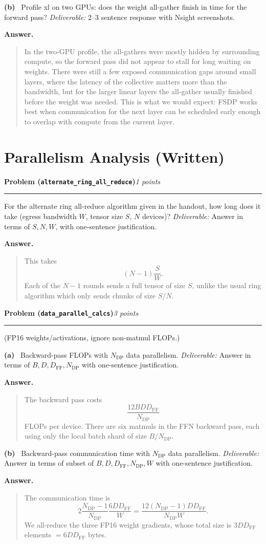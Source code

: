 \documentclass[11pt]{article}
\newcommand{\problem}[2]{%
  \vspace{0.6em}%
  \noindent\textbf{Problem (\texttt{#1})}\hfill\textit{#2 points}\par%
  \vspace{0.2em}\hrule\vspace{0.4em}%
}
\newcommand{\subq}[1]{\vspace{0.3em}\noindent\textbf{(#1)}\ }
\newcommand{\deliverable}[1]{\vspace{0.2em}\noindent\textit{Deliverable:} #1\par}
\newenvironment{answer}{%
  \vspace{0.3em}%
  \noindent\textbf{Answer.}\begin{quote}%
}{%
  \end{quote}\vspace{0.4em}%
}
\begin{document}
\subq{b} Profile xl on two GPUs: does the weight all-gather finish in time for the forward pass?
\deliverable{2--3 sentence response with Nsight screenshots.}
\begin{answer}
  In the two-GPU profile, the all-gathers were mostly hidden by surrounding compute, so the forward pass did not appear to stall for long waiting on weights. There were still a few exposed communication gaps around small layers, where the latency of the collective matters more than the bandwidth, but for the larger linear layers the all-gather usually finished before the weight was needed. This is what we would expect: FSDP works best when communication for the next layer can be scheduled early enough to overlap with compute from the current layer.
\end{answer}


\section{Parallelism Analysis (Written)}

\problem{alternate\_ring\_all\_reduce}{1}
For the alternate ring all-reduce algorithm given in the handout, how long does it take (egress bandwidth $W$, tensor size $S$, $N$ devices)?
\deliverable{Answer in terms of $S, N, W$, with one-sentence justification.}
\begin{answer}
  This takes
  \[
    (N-1)\frac{S}{W}.
  \]
  Each of the \(N-1\) rounds sends a full tensor of size \(S\), unlike the usual ring algorithm which only sends chunks of size \(S/N\).
\end{answer}


\problem{data\_parallel\_calcs}{3}
(FP16 weights/activations, ignore non-matmul FLOPs.)

\subq{a} Backward-pass FLOPs with $N_{\mathrm{DP}}$ data parallelism.
\deliverable{Answer in terms of $B, D, D_{\mathrm{FF}}, N_{\mathrm{DP}}$ with one-sentence justification.}
\begin{answer}
  The backward pass costs
  \[
    \frac{12 B D D_{\mathrm{FF}}}{N_{\mathrm{DP}}}
  \]
  FLOPs per device. There are six matmuls in the FFN backward pass, each using only the local batch shard of size \(B/N_{\mathrm{DP}}\).
\end{answer}

\subq{b} Backward-pass communication time with $N_{\mathrm{DP}}$ data parallelism.
\deliverable{Answer in terms of subset of $B, D, D_{\mathrm{FF}}, N_{\mathrm{DP}}, W$ with one-sentence justification.}
\begin{answer}
  The communication time is
  \[
    2\frac{N_{\mathrm{DP}}-1}{N_{\mathrm{DP}}}\frac{6 D D_{\mathrm{FF}}}{W}
    =
    \frac{12 (N_{\mathrm{DP}}-1) D D_{\mathrm{FF}}}{N_{\mathrm{DP}} W}.
  \]
  We all-reduce the three FP16 weight gradients, whose total size is \(3 D D_{\mathrm{FF}}\) elements \(=6D D_{\mathrm{FF}}\) bytes.
\end{answer}
\end{document}

